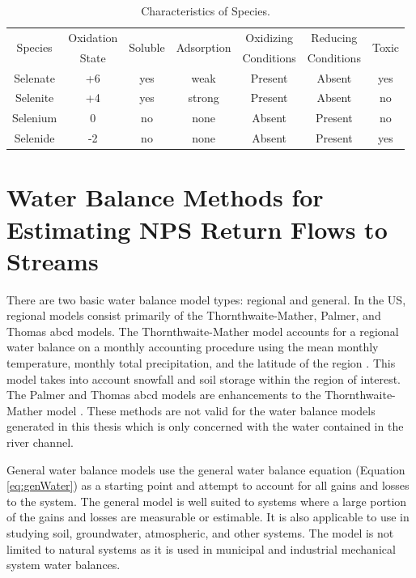 \begin{linenumbers}[1]
\begin{table}[!htbp]
\centering
\caption[Characteristics of \Se Species.]{Characteristics of \Se Species.}
\label{tab:SeSpeciesCharacteristics}
\begin{tabular}{ccccccc} 
\toprule
	\multirow{2}{*}{\Se Species} & Oxidation & \multirow{2}{*}{Soluble} & \multirow{2}{*}{Adsorption} & Oxidizing & Reducing & \multirow{2}{*}{Toxic} \\
		& State &  & & Conditions & Conditions & \\ 
\midrule
	Selenate & +6 & yes & weak & Present & Absent & yes \\
	Selenite & +4 & yes & strong & Present & Absent & no \\
	Selenium & 0 & no & none & Absent & Present & no \\
	Selenide & -2 & no & none & Absent & Present & yes \\
\bottomrule
\end{tabular}
\end{table}


\section{Water Balance Methods for Estimating NPS Return Flows to Streams}
\label{sec:water balance methods}
There are two basic water balance model types: regional and general.  In the US, regional models consist primarily of the Thornthwaite-Mather, Palmer, and Thomas abcd models.  The Thornthwaite-Mather model accounts for a regional water balance on a monthly accounting procedure using the mean monthly temperature, monthly total precipitation, and the latitude of the region \parencite{Thornthwaite1955}.  This model takes into account snowfall and soil storage within the region of interest.  The Palmer and Thomas abcd models are enhancements to the Thornthwaite-Mather model \parencite{Palmer1965,Thomas1983}.  These methods are not valid for the water balance models generated in this thesis which is only concerned with the water contained in the river channel.

General water balance models use the general water balance equation (Equation \ref{eq:genWater}) as a starting point and attempt to account for all gains and losses to the system.  The general model is well suited to systems where a large portion of the gains and losses are measurable or estimable.  It is also applicable to use in studying soil, groundwater, atmospheric, and other systems.  The model is not limited to natural systems as it is used in municipal and industrial mechanical system water balances.


\end{linenumbers}
